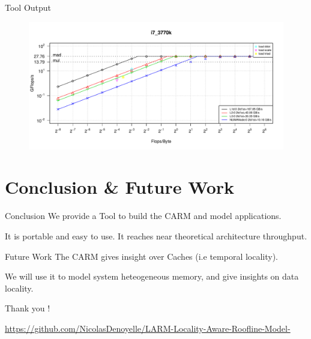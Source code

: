 \begin{nframe}{Tool Output}
  \begin{figure}
    \centering
    \includegraphics[width=\textwidth, height=.6\paperheight, keepaspectratio]{pictures/CARM_i7_3770k.pdf}
  \end{figure}  
\end{nframe}

\section{Conclusion \& Future Work}

\begin{frame}
  \begin{block}{Conclusion}
    We provide a Tool to build the CARM and model applications.

    It is portable and easy to use. It reaches near theoretical architecture throughput.
  \end{block}
  \begin{block}{Future Work}
    The CARM gives insight over Caches (i.e temporal locality).

    We will use it to model system heteogeneous memory, and give insights on data locality.
    
  \end{block}
\end{frame}
    

\begin{frame}
  \vspace{1cm}
  \begin{minipage}[t][.8\textheight]{\textwidth}
  \vspace{2.5cm}
  \centering
  {\LARGE{Thank you !}}

  \vfill
  \small{\href{https://github.com/NicolasDenoyelle/LARM-Locality-Aware-Roofline-Model-}{https://github.com/NicolasDenoyelle/LARM-Locality-Aware-Roofline-Model-}}
  \end{minipage}
\end{frame}

